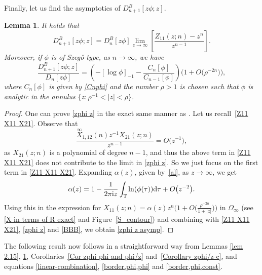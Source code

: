 \documentclass[pdftex]{sigma}
\numberwithin{equation}{section}
\newtheorem{Lemma}[Theorem]{Lemma}
 { \theoremstyle{definition}
\newtheorem{Definition}[Theorem]{Definition}
\newtheorem{Example}[Theorem]{Example}
\newtheorem{Remark}[Theorem]{Remark}
\newtheorem{Question}[Theorem]{Question}
}
\newcommand{\T}{{\mathbb T}}
\newcommand{\al}{\alpha}
\newcommand{\Om}{\Omega}
\newcommand{\ii}{{\rm i}}
\newcommand{\dd}{{\rm d}}
\begin{document}
		Finally, let us find the asymptotics of $D^B_{n+1}[z\phi;z]$.
		\begin{Lemma}\label{lem 2.16} It holds that
			\begin{equation}\label{zphi z}
				D^B_{n+1}[z\phi;z] = D^B_{n}[z\phi] \lim_{z \to \infty} \left[ \frac{Z_{11}(z;n)-z^n}{z^{n-1}} \right].
			\end{equation}
			Moreover, if $\phi$ is of Szeg\H{o}-type, as $n \to \infty$, we have
			\begin{equation}\label{zphi z asymp}
				\frac{D^B_{n+1}\left[z\phi;z\right]}{D_n[z\phi]}		 = \left( - [\log \phi]_{-1} - \frac{C_n[\phi]}{C_{n-1}[\phi]} \right) \big(1 + O\big(\rho^{-2n}\big)\big),
			\end{equation}
			where $C_n[\phi]$ is given by \eqref{Cnphi} and	the number $\rho>1$ is chosen such that $\phi$ is analytic in the annulus $\big\{z\colon \rho^{-1}<|z|<\rho\big\}$.
		\end{Lemma}
		\begin{proof}
			One can prove \eqref{zphi z} in the exact same manner as \cite[equation (2.16)]{BEGIL}. Let us recall~\eqref{Z11 X11 X21}. Observe that
 \[
 \frac{\overset{\infty}{X}_{1,12}(n) z^{-1} X_{21}(z;n)}{z^{n-1}} = O\big(z^{-1}\big),
 \]
 as $X_{21}(z;n)$ is a polynomial of degree $n-1$, and thus the above term in \eqref{Z11 X11 X21} does not contribute to the limit in \eqref{zphi z}. So we just focus on the first term in \eqref{Z11 X11 X21}. Expanding $\al(z)$, given by~\eqref{al}, as $z \to \infty $, we get
			\begin{gather*}%
				\al(z) = 1 - \frac{1}{2\pi \ii z} \int_{\T} \ln (\phi(\tau)) \dd \tau + O\big(z^{-2}\big).
			\end{gather*}
			Using this in the expression for $X_{11}(z;n) = \al(z) z^n \big(1 + O \big(\frac{\rho^{-2n}}{1+|z|}\big)\big)$ in $\Om_{\infty}$ (see \eqref{X in terms of R exact} and Figure~\ref{S_contour}) and combining with \eqref{Z11 X11 X21}, \eqref{zphi z} and \eqref{BBB}, we obtain \eqref{zphi z asymp}.	
		\end{proof}

		The following result now follows in a straightforward way from Lemmas \ref{lem 2.15}, \ref{lem 2.16}, Corollaries~\ref{Cor zphi phi and phi/z} and~\ref{Corollary zphi/z-c}, and equations \eqref{linear-combination}, \eqref{border,phi,phi} and \eqref{border,phi,const}.
		
\end{document}
